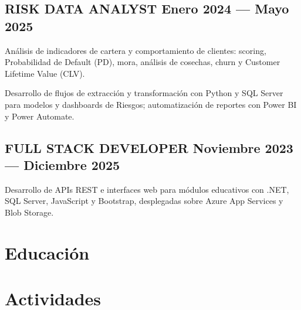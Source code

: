 \documentclass[letter,10pt]{article}
\begin{document}
\subsection{{RISK DATA ANALYST \hfill Enero 2024 --- Mayo 2025}}
\begin{zitemize}
\item Análisis de indicadores de cartera y comportamiento de clientes: scoring, Probabilidad de Default (PD), mora, análisis de cosechas, churn y Customer Lifetime Value (CLV).
\item Desarrollo de flujos de extracción y transformación con Python y SQL Server para modelos y dashboards de Riesgos; automatización de reportes con Power BI y Power Automate.
\end{zitemize}

\subsection{{FULL STACK DEVELOPER \hfill Noviembre 2023 --- Diciembre 2025}}
\begin{zitemize}
\item Desarrollo de APIs REST e interfaces web para módulos educativos con .NET, SQL Server, JavaScript y Bootstrap, desplegadas sobre Azure App Services y Blob Storage.
\end{zitemize}


\section{Educación}


\section{Actividades}

\end{document}
